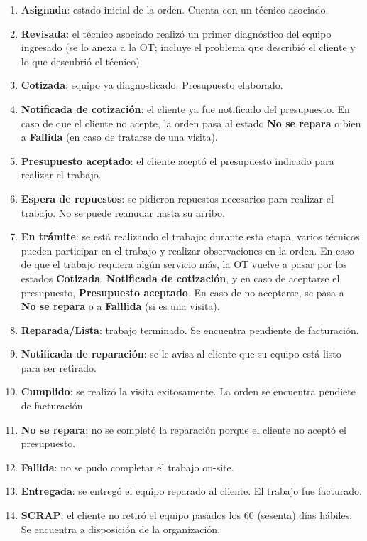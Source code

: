 \documentclass[12pt]{extarticle}
\begin{document}
\begin{spacing}{1.2}
        \begin{enumerate}
            \item \textbf{Asignada}: estado inicial de la orden. Cuenta con un técnico asociado.
            \item \textbf{Revisada}: el técnico asociado realizó un primer diagnóstico del equipo ingresado (se lo anexa a la OT; incluye el problema que describió el cliente y lo que descubrió el técnico).
            \item \textbf{Cotizada}: equipo ya diagnosticado. Presupuesto elaborado.
            \item \textbf{Notificada de cotización}: el cliente ya fue notificado del presupuesto. En caso de que el cliente no acepte, la orden pasa al estado \textbf{No se repara} o bien a \textbf{Fallida} (en caso de tratarse de una visita). 
            \item \textbf{Presupuesto aceptado}: el cliente aceptó el presupuesto indicado para realizar el trabajo.
            \item \textbf{Espera de repuestos}: se pidieron repuestos necesarios para realizar el trabajo. No se puede reanudar hasta su arribo.
            \item \textbf{En trámite}: se está realizando el trabajo; durante esta etapa, varios técnicos pueden participar en el trabajo y realizar observaciones en la orden. En caso de que el trabajo requiera algún servicio más, la OT vuelve a pasar por los estados \textbf{Cotizada}, \textbf{Notificada de cotización}, y en caso de aceptarse el presupuesto, \textbf{Presupuesto aceptado}. En caso de no aceptarse, se pasa a \textbf{No se repara} o a \textbf{Falllida} (si es una visita).
            \item \textbf{Reparada/Lista}: trabajo terminado. Se encuentra pendiente de facturación.
            \item \textbf{Notificada de reparación}: se le avisa al cliente que su equipo está listo para ser retirado.
            \item \textbf{Cumplido}: se realizó la visita exitosamente. La orden se encuentra pendiete de facturación.
            \item \textbf{No se repara}: no se completó la reparación porque el cliente no aceptó el presupuesto.
            \item \textbf{Fallida}: no se pudo completar el trabajo on-site.
            \item \textbf{Entregada}: se entregó el equipo reparado al cliente. El trabajo fue facturado.
            \item \textbf{SCRAP}: el cliente no retiró el equipo pasados los 60 (sesenta) días hábiles. Se encuentra a disposición de la organización.
        \end{enumerate}


\end{spacing}
\end{document}
